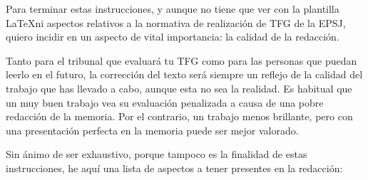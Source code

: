 Para terminar estas instrucciones, y aunque no tiene que ver con la plantilla \LaTeX ni aspectos relativos a la normativa de realización de TFG de la EPSJ, quiero incidir en un aspecto de vital importancia: la calidad de la redacción.

Tanto para el tribunal que evaluará tu TFG como para las personas que puedan leerlo en el futuro, la corrección del texto será siempre un reflejo de la calidad del trabajo que has llevado a cabo, aunque esta no sea la realidad. Es habitual que un muy buen trabajo vea su evaluación penalizada a causa de una pobre redacción de la memoria. Por el contrario, un trabajo menos brillante, pero con una presentación perfecta en la memoria puede ser mejor valorado.

Sin ánimo de ser exhaustivo, porque tampoco es la finalidad de estas instrucciones, he aquí una lista de aspectos a tener presentes en la redacción:

